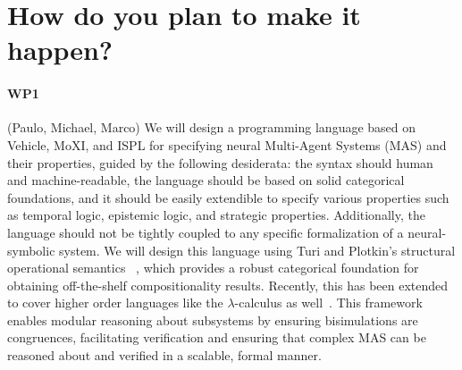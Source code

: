 \documentclass[11pt]{article}
\begin{document}
\section{How do you plan to make it happen?}




\paragraph{WP1} (Paulo, Michael, Marco)
We will design a programming language based on Vehicle, MoXI, and ISPL for
specifying neural Multi-Agent Systems (MAS) and their properties, guided by the
following desiderata: the syntax should human and machine-readable, the language
should be based on solid categorical foundations, and it should be easily
extendible to specify various properties such as temporal logic, epistemic
logic, and strategic properties. Additionally, the language should not be
tightly coupled to any specific formalization of a neural-symbolic system. We
will design this language using Turi and Plotkin's structural operational
semantics ~\cite{TuriP97}, which provides a robust categorical foundation for
obtaining off-the-shelf compositionality results. Recently, this has been
extended to cover higher order languages like the $\lambda$-calculus as
well~\cite{GoncharovMSTU23}. This framework enables modular reasoning about
subsystems by ensuring bisimulations are congruences, facilitating verification
and ensuring that complex MAS can be reasoned about and verified in a scalable,
formal manner.
\end{document}
